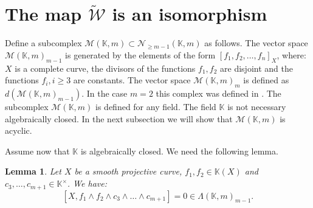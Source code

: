 \documentclass[12pt]{extarticle}
\newtheorem{lemma}[theorem]{Lemma}
\def\mb{\mathbb}
\def\mc{\mathcal}
\def\L{\Lambda}
\def\k{\mb K}
\def\N{\mc N}
\def\t{\times}
\def\wt{\widetilde}
\def\wdw{\wedge\dots\wedge}
\def\W{\mc W}
\def \tW{\wt{\W}}
\def \wW{\tW}
\def \M{\mc M}
\begin{document}
\section{The map $\wW$ is an isomorphism}
\label{sec:W_isomorphsim}
Define a subcomplex $\M(\k,m)\subset \N_{\geq m-1}(\k,m)$ as follows. The vector space $\M(\k,m)_{m-1}$ is generated by the elements of the form $[f_1,f_2,\dots, f_n]_X$, where: $X$ is a complete curve, the divisors of the functions $f_1, f_2$ are disjoint and the functions $f_i,i\geq 3$ are constants. The vector space $\M(\k,m)_m$ is defined as $d(\M(\k,m)_{m-1})$. In the case $m=2$ this complex was defined in \cite{cubical1999herbert}. The subcomplex $\M(\k,m)$ is defined for any field. The field $\k$ is not necessary algebraically closed. In the next subsection we will show that $\M(\k,m)$ is acyclic. 

Assume now that $\k$ is algebraically closed. We need the following lemma.
\begin{lemma}
\label{lemma:Beilinson_Soule_vanishing}
Let $X$ be a smooth projective curve, $f_1,f_2\in\k(X)$ and $c_3,\dots, c_{m+1}\in\k^\t$. We have:
        $$[X, f_1\wedge f_2\wedge c_3\wdw c_{m+1}]=0\in \L(\k,m)_{m-1}.$$
\end{lemma}
\end{document}

